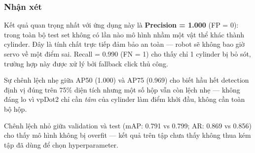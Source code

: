 \subsubsection*{Nhận xét}

Kết quả quan trọng nhất với ứng dụng này là \textbf{Precision =
1.000} (FP = 0): trong toàn bộ test set không có lần nào mô hình
nhầm một vật thể khác thành cylinder. Đây là tính chất trực tiếp
đảm bảo an toàn --- robot sẽ không bao giờ servo về một điểm sai.
Recall = 0.990 (FN = 1) cho thấy chỉ 1 cylinder bị bỏ sót, trường
hợp này được xử lý bởi fallback click thủ công.

Sự chênh lệch nhẹ giữa AP50 (1.000) và AP75 (0.969) cho biết hầu
hết detection định vị đúng trên 75\% diện tích nhưng một số hộp
vẫn còn lệch nhẹ --- không đáng lo vì vpDot2 chỉ cần
\textit{tâm} của cylinder làm điểm khởi đầu, không cần toàn bộ
hộp.

Chênh lệch nhỏ giữa validation và test (mAP: 0.791 vs 0.799;
AR: 0.869 vs 0.856) cho thấy mô hình không bị overfit --- kết quả
trên tập chưa thấy không thua kém tập đã dùng để chọn hyperparameter.
